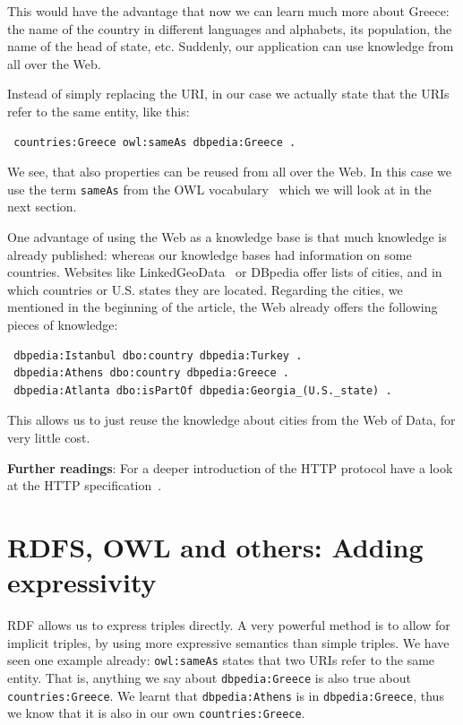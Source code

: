 This would have the advantage that now we can learn much more about Greece: the name of the country in different languages and alphabets, its population, the name of the head of state, etc.
Suddenly, our application can use knowledge from all over the Web.

Instead of simply replacing the URI, in our case we actually state that the URIs refer to the same entity, like this:

\begin{verbatim}
 countries:Greece owl:sameAs dbpedia:Greece .
\end{verbatim}

We see, that also properties can be reused from all over the Web.
In this case we use the term \texttt{sameAs} from the OWL vocabulary~\cite{owl} which we will look at in the next section.

One advantage of using the Web as a knowledge base is that much knowledge is already published:
whereas our knowledge bases had information on some countries.
Websites like LinkedGeoData~\cite{linkedgeodata} or DBpedia offer lists of cities, and in which countries or U.S. states they are located.
Regarding the cities, we mentioned in the beginning of the article, the Web already offers the following pieces of knowledge:

\begin{verbatim}
 dbpedia:Istanbul dbo:country dbpedia:Turkey .
 dbpedia:Athens dbo:country dbpedia:Greece .
 dbpedia:Atlanta dbo:isPartOf dbpedia:Georgia_(U.S._state) .
\end{verbatim}

This allows us to just reuse the knowledge about cities from the Web of Data, for very little cost.

\medskip

\textbf{Further readings}:
For a deeper introduction of the HTTP protocol have a look at the HTTP specification~\cite{http}.

\section{RDFS, OWL and others: Adding expressivity}
\label{rdfs}

RDF allows us to express triples directly.
A very powerful method is to allow for implicit triples, by using more expressive semantics than simple triples.
We have seen one example already: \texttt{owl:sameAs} states that two URIs refer to the same entity.
That is, anything we say about \texttt{dbpedia:Greece} is also true about \texttt{countries:Greece}.
We learnt that \texttt{dbpedia:Athens} is in \texttt{dbpedia:Greece}, thus we know that it is also in our own \texttt{countries:Greece}.

